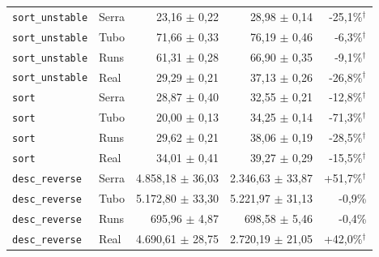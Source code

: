 \begin{tabular}{llrrr}
\texttt{sort\_unstable} & Serra & 23,16 $\pm$ 0,22 & 28,98 $\pm$ 0,14 & -25,1\%$^{\dagger}$ \\
\texttt{sort\_unstable} & Tubo & 71,66 $\pm$ 0,33 & 76,19 $\pm$ 0,46 & -6,3\%$^{\dagger}$ \\
\texttt{sort\_unstable} & Runs & 61,31 $\pm$ 0,28 & 66,90 $\pm$ 0,35 & -9,1\%$^{\dagger}$ \\
\texttt{sort\_unstable} & Real & 29,29 $\pm$ 0,21 & 37,13 $\pm$ 0,26 & -26,8\%$^{\dagger}$ \\
\texttt{sort} & Serra & 28,87 $\pm$ 0,40 & 32,55 $\pm$ 0,21 & -12,8\%$^{\dagger}$ \\
\texttt{sort} & Tubo & 20,00 $\pm$ 0,13 & 34,25 $\pm$ 0,14 & -71,3\%$^{\dagger}$ \\
\texttt{sort} & Runs & 29,62 $\pm$ 0,21 & 38,06 $\pm$ 0,19 & -28,5\%$^{\dagger}$ \\
\texttt{sort} & Real & 34,01 $\pm$ 0,41 & 39,27 $\pm$ 0,29 & -15,5\%$^{\dagger}$ \\
\texttt{desc\_reverse} & Serra & 4.858,18 $\pm$ 36,03 & 2.346,63 $\pm$ 33,87 & +51,7\%$^{\dagger}$ \\
\texttt{desc\_reverse} & Tubo & 5.172,80 $\pm$ 33,30 & 5.221,97 $\pm$ 31,13 & -0,9\% \\
\texttt{desc\_reverse} & Runs & 695,96 $\pm$ 4,87 & 698,58 $\pm$ 5,46 & -0,4\% \\
\texttt{desc\_reverse} & Real & 4.690,61 $\pm$ 28,75 & 2.720,19 $\pm$ 21,05 & +42,0\%$^{\dagger}$ \\
\hline
\end{tabular}
